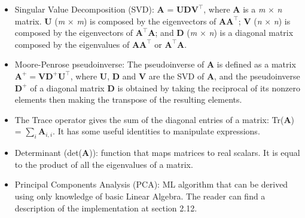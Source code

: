 \documentclass{article}
\begin{document}
\begin{itemize}
\item Singular Value Decomposition (SVD): \textbf{A} = \textbf{UD}\(\boldsymbol{V}^\top\), where \textbf{A} is a \textit{m} \(\times\) \textit{n} matrix. \textbf{U} (\textit{m} \(\times\) \textit{m}) is composed by the eigenvectors of \(\boldsymbol{ AA}^\top\); \textbf{V} (\textit{n} \(\times\) \textit{n}) is composed by the eigenvectors of \(\boldsymbol{ A}^\top\boldsymbol{A}\); and  \textbf{D} (\textit{m} \(\times\) \textit{n}) is a diagonal matrix composed by the eigenvalues of \(\boldsymbol{AA}^\top\) or \(\boldsymbol{A}^\top\boldsymbol{A}\).
\item Moore-Penrose pseudoinverse: The pseudoinverse of \textbf{A} is defined as a matrix \(\boldsymbol{A}^{+} = \boldsymbol{VD}^{+}\boldsymbol{U}^\top\), where \textbf{U}, \textbf{D} and \textbf{V} are the SVD of \textbf{A}, and the pseudoinverse \(\boldsymbol{D}^+\) of a diagonal matrix \textbf{D} is obtained by taking the reciprocal of its nonzero elements then making the transpose of the resulting elements.
\item The Trace operator gives the sum of the diagonal entries of a matrix: Tr(\textbf{A}) = \(\sum_i \boldsymbol{A}_{i,i}\). It has some useful identities to manipulate expressions.
\item Determinant (det(\textbf{A})): function that maps matrices to real scalars. It is equal to the product of all the eigenvalues of a matrix.
\item Principal Components Analysis (PCA): ML algorithm that can be derived using only knowledge of basic Linear Algebra. The reader can find a description of the implementation at section 2.12.
\end{itemize}
\end{document}
